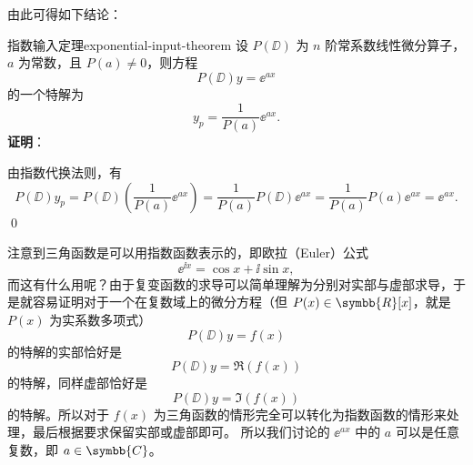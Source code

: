 由此可得如下结论：
\begin{theorem}{指数输入定理}{exponential-input-theorem}
    设 $ P(\DD) $ 为 $ n $ 阶常系数线性微分算子，$ a $ 为常数，且 $ P(a) \neq 0 $，则方程
    \begin{equation*}
        P(\DD) y = \ee^{ax}
    \end{equation*}
    的一个特解为
    \begin{equation}
        y_p = \frac{1}{P(a)} \ee^{ax} .
    \end{equation}
    \textbf{证明}：

    由指数代换法则，有
    \begin{equation*}
        P(\DD) y_p = P(\DD) \left( \frac{1}{P(a)} \ee^{ax} \right) = \frac{1}{P(a)} P(\DD) \ee^{ax} = \frac{1}{P(a)} P(a) \ee^{ax} = \ee^{ax} .
    \end{equation*}
    \qed
\end{theorem}

注意到三角函数是可以用指数函数表示的，即欧拉（Euler）公式
\begin{equation}
    \ee^{\ii x} = \cos x + \ii \sin x ,
\end{equation}
而这有什么用呢？由于复变函数的求导可以简单理解为分别对实部与虚部求导，于是就容易证明对于一个在复数域上的微分方程（但 $ P(x) \in \symbb{R}[x] $，就是 $ P (x) $ 为实系数多项式）
\begin{equation}
    P(\DD) y = f (x)
\end{equation}
的特解的实部恰好是
\begin{equation}
    P(\DD) y = \Re (f (x))
\end{equation}
的特解，同样虚部恰好是
\begin{equation}
    P(\DD) y = \Im (f (x))
\end{equation}
的特解。所以对于 $ f (x) $ 为三角函数的情形完全可以转化为指数函数的情形来处理，最后根据要求保留实部或虚部即可。
所以我们讨论的 $ \ee^{ax} $ 中的 $ a $ 可以是任意复数，即 $ a \in \symbb{C} $。

